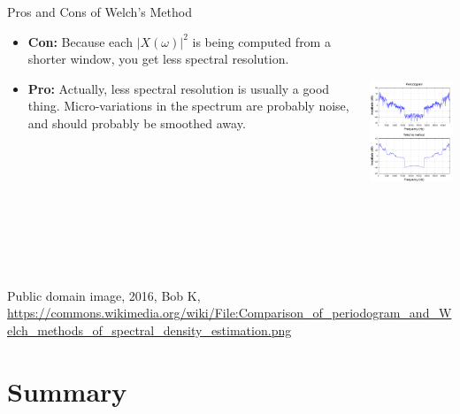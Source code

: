 \documentclass{beamer}
\begin{document}
\begin{frame}
  \begin{columns}
    \column{2in}
    \begin{block}{Pros and Cons of Welch's Method}
      \begin{itemize}
      \item {\bf Con:} Because each $|X(\omega)|^2$ is being computed
        from a shorter window, you get less spectral resolution.
      \item {\bf Pro:} Actually, less spectral resolution is usually a
        good thing.  Micro-variations in the spectrum are probably noise,
        and should probably be smoothed away.
      \end{itemize}
    \end{block}
    \column{2.5in}
    \begin{block}{}
      \centerline{\includegraphics[height=3in]{Welch.png}}
    \end{block}
  \end{columns}
  \begin{tiny}
    Public domain image, 2016, Bob K,
    \url{https://commons.wikimedia.org/wiki/File:Comparison_of_periodogram_and_Welch_methods_of_spectral_density_estimation.png}\par
  \end{tiny}
\end{frame}

\section[Summary]{Summary}
\setcounter{subsection}{1}
\end{document}
